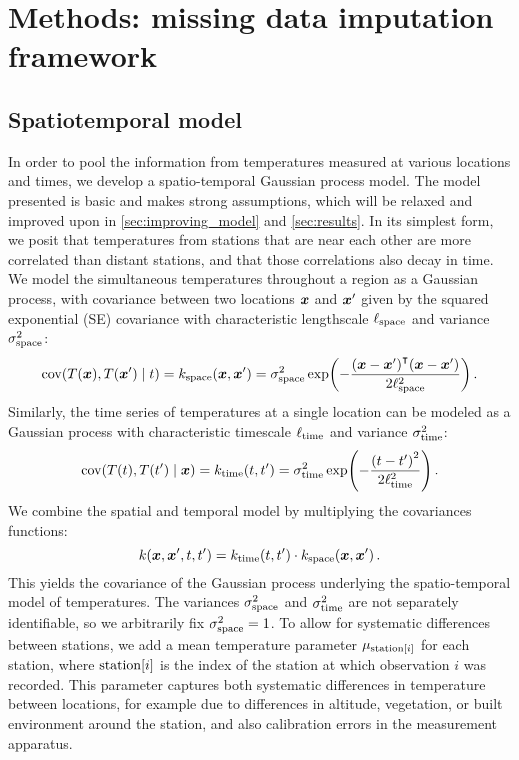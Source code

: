 \section{Methods: missing data imputation framework}\label{sec:methods}

\subsection{Spatiotemporal model}
\label{sec:spatiotemporal_model}

In order to pool the information from temperatures measured at various locations and times, we develop a spatio-temporal Gaussian process model.
The model presented is basic and makes strong assumptions,
which will be relaxed and improved upon in \autoref{sec:improving_model} and \autoref{sec:results}.
In its simplest form, we posit that temperatures from stations that are near each other are more correlated than distant stations, and that those correlations also decay in time.
We model the simultaneous temperatures throughout a region as a Gaussian process, with covariance between two locations \(\bm{x}\) and \(\bm{x}'\) given by the squared exponential (SE) covariance with characteristic lengthscale \(\ell_{\mathrm{space}}\) and variance \(\sigma_{\mathrm{space}}^2\):
\begin{equation}
    \cov\del{T(\xvec), T(\xvec') \mid t} = k_{\subspace}(\xvec, \xvec') =  \sigma_{\subspace}^2 \exp\del{-\frac{\del{\xvec-\xvec'}\trans\del{\xvec-\xvec'}}{2\ell_{\subspace}^2}}\,.
    \label{eq:squaredexpo}
\end{equation}
Similarly, the time series of temperatures at a single location can be modeled as a Gaussian process with characteristic timescale \(\ell_{\mathrm{time}}\) and variance \(\sigma_{\mathrm{time}}^2\):
\begin{equation}
\cov\del{T(t), T(t') \mid \xvec} = k_{\subtime}(t, t') = \sigma_{\subtime}^2 \exp\del{-\frac{\del{t-t'}^2}{2\ell_{\subtime}^2}}\,.
\end{equation}
We combine the spatial and temporal model by multiplying the covariances functions:
\begin{equation}
k(\bm{x},\bm{x}',t,t') = k_{\mathrm{time}}(t,t') \cdot k_{\mathrm{space}}(\bm{x}, \bm{x}')\,.
\end{equation}
This yields the covariance of the Gaussian process underlying the spatio-temporal model of temperatures.
The variances \(\sigma_{\mathrm{space}}^2\) and \(\sigma_{\mathrm{time}}^2\) are not separately identifiable, so we arbitrarily fix \(\sigma_{\mathrm{space}}^2=1\).
To allow for systematic differences between stations, we add a mean temperature parameter \(\mu_{\mathrm{station}\left\lbrack i\right\rbrack}\) for each station, where \(\station{i}\) is the index of the station at which observation \(i\) was recorded.
This parameter captures both systematic differences in temperature between locations, for example due to differences in altitude, vegetation, or built environment around the station, and also calibration errors in the measurement apparatus.

